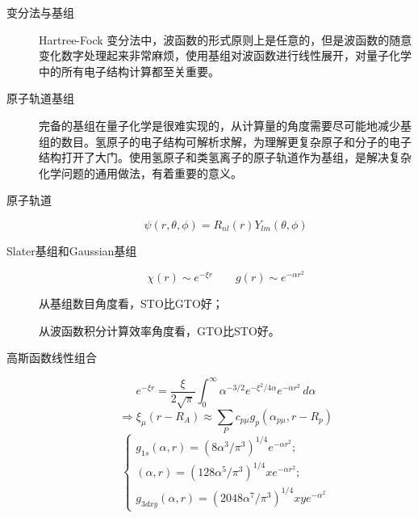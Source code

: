\begin{description}
	\item[变分法与基组] Hartree-Fock 变分法中，波函数的形式原则上是任意的，但是波函数的随意变化数字处理起来非常麻烦，使用基组对波函数进行线性展开，对量子化学中的所有电子结构计算都至关重要。

	\item[原子轨道基组] 完备的基组在量子化学是很难实现的，从计算量的角度需要尽可能地减少基组的数目。氢原子的电子结构可解析求解，为理解更复杂原子和分子的电子结构打开了大门。使用氢原子和类氢离子的原子轨道作为基组，是解决复杂化学问题的通用做法，有着重要的意义。

	\item[原子轨道]
	\begin{equation}
		\psi(r,\theta,\phi)=R_{nl}(r)Y_{lm}(\theta,\phi)
	\end{equation}

	\item[Slater基组和Gaussian基组]
	\begin{equation}
	\chi(r)\sim e^{-\xi r} \qquad g(r)\sim e^{-\alpha r^2}
	\end{equation}

	从基组数目角度看，STO比GTO好；

	从波函数积分计算效率角度看，GTO比STO好。

	\item[高斯函数线性组合]
	\begin{equation}
	e^{-\xi r}=\frac{\xi}{2\sqrt{\pi}}\int_0^\infty \alpha^{-3/2} e^{-\xi^2/4\alpha}e^{-\alpha r^2} \, d\alpha 
	\end{equation}
	\begin{equation}
	\Rightarrow \xi_\mu(r-R_A)\approx \sum_Pc_{p\mu}g_p(\alpha_{p\mu},r-R_p)
	\end{equation}
	\begin{equation}
	\begin{cases}
	g_{1s}(\alpha,r)=(8\alpha^3/\pi^3)^{1/4}e^{-\alpha r^2};\\
	(\alpha,r)=(128\alpha^5/\pi^3)^{1/4}xe^{-\alpha r^2};\\
	g_{3dxy}(\alpha,r)=(2048\alpha^7/\pi^3)^{1/4}xye^{-\alpha^2}
	\end{cases}
	\end{equation}
\end{description}

